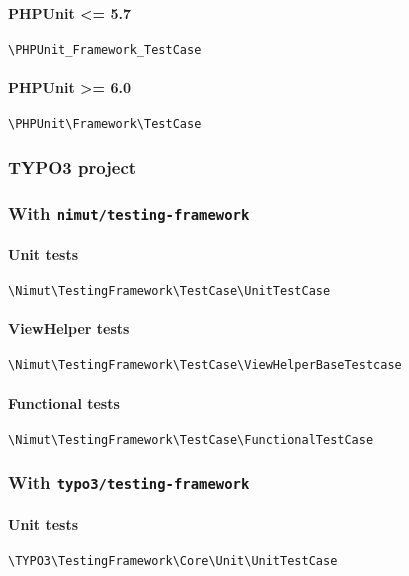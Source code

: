 \documentclass[a4paper,11pt,headsepline]{scrartcl}
\begin{document}
\paragraph{PHPUnit <= 5.7} \texttt{\textbackslash PHPUnit\_Framework\_TestCase}
\paragraph{PHPUnit >= 6.0} \texttt{\textbackslash PHPUnit\textbackslash Framework\textbackslash TestCase}

\subsubsection{TYPO3 project}
\subsubsection{With \texttt{nimut/testing-framework}}

\paragraph{Unit tests}
\texttt{\textbackslash Nimut\textbackslash TestingFramework\textbackslash TestCase\textbackslash UnitTestCase}

\paragraph{ViewHelper tests}
\texttt{\textbackslash Nimut\textbackslash TestingFramework\textbackslash TestCase\textbackslash ViewHelperBaseTestcase}

\paragraph{Functional tests}
\texttt{\textbackslash Nimut\textbackslash TestingFramework\textbackslash TestCase\textbackslash FunctionalTestCase}


\subsubsection{With \texttt{typo3/testing-framework}}

\paragraph{Unit tests}
\texttt{\textbackslash TYPO3\textbackslash TestingFramework\textbackslash Core\textbackslash Unit\textbackslash UnitTestCase}
\end{document}
